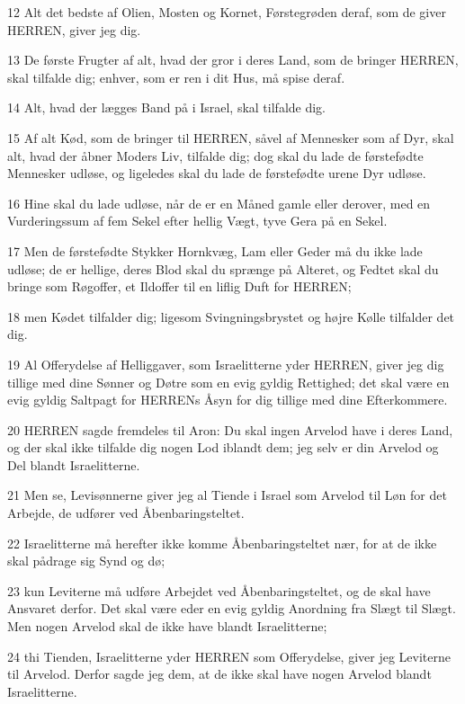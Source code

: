 \par 12 Alt det bedste af Olien, Mosten og Kornet, Førstegrøden deraf, som de giver HERREN, giver jeg dig.
\par 13 De første Frugter af alt, hvad der gror i deres Land, som de bringer HERREN, skal tilfalde dig; enhver, som er ren i dit Hus, må spise deraf.
\par 14 Alt, hvad der lægges Band på i Israel, skal tilfalde dig.
\par 15 Af alt Kød, som de bringer til HERREN, såvel af Mennesker som af Dyr, skal alt, hvad der åbner Moders Liv, tilfalde dig; dog skal du lade de førstefødte Mennesker udløse, og ligeledes skal du lade de førstefødte urene Dyr udløse.
\par 16 Hine skal du lade udløse, når de er en Måned gamle eller derover, med en Vurderingssum af fem Sekel efter hellig Vægt, tyve Gera på en Sekel.
\par 17 Men de førstefødte Stykker Hornkvæg, Lam eller Geder må du ikke lade udløse; de er hellige, deres Blod skal du sprænge på Alteret, og Fedtet skal du bringe som Røgoffer, et Ildoffer til en liflig Duft for HERREN;
\par 18 men Kødet tilfalder dig; ligesom Svingningsbrystet og højre Kølle tilfalder det dig.
\par 19 Al Offerydelse af Helliggaver, som Israelitterne yder HERREN, giver jeg dig tillige med dine Sønner og Døtre som en evig gyldig Rettighed; det skal være en evig gyldig Saltpagt for HERRENs Åsyn for dig tillige med dine Efterkommere.
\par 20 HERREN sagde fremdeles til Aron: Du skal ingen Arvelod have i deres Land, og der skal ikke tilfalde dig nogen Lod iblandt dem; jeg selv er din Arvelod og Del blandt Israelitterne.
\par 21 Men se, Levisønnerne giver jeg al Tiende i Israel som Arvelod til Løn for det Arbejde, de udfører ved Åbenbaringsteltet.
\par 22 Israelitterne må herefter ikke komme Åbenbaringsteltet nær, for at de ikke skal pådrage sig Synd og dø;
\par 23 kun Leviterne må udføre Arbejdet ved Åbenbaringsteltet, og de skal have Ansvaret derfor. Det skal være eder en evig gyldig Anordning fra Slægt til Slægt. Men nogen Arvelod skal de ikke have blandt Israelitterne;
\par 24 thi Tienden, Israelitterne yder HERREN som Offerydelse, giver jeg Leviterne til Arvelod. Derfor sagde jeg dem, at de ikke skal have nogen Arvelod blandt Israelitterne.
